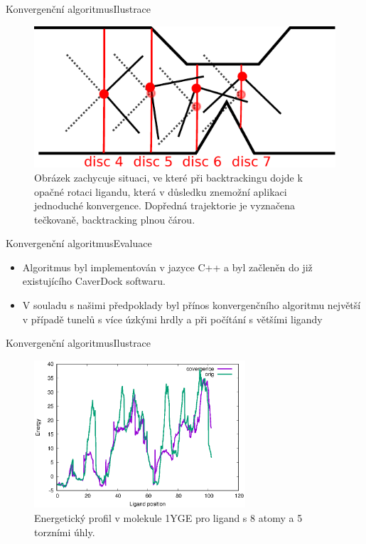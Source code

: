 \documentclass{beamer}
\begin{document}
\begin{frame}{Konvergenční algoritmus}{Ilustrace}
    \begin{figure}
        \includegraphics[width=\textwidth]{img/backtracking_bad_rotation.pdf}
        \caption{Obrázek zachycuje situaci, ve které při backtrackingu dojde k opačné
rotaci ligandu, která v důsledku znemožní aplikaci jednoduché konvergence.
Dopředná trajektorie je vyznačena tečkovaně, backtracking plnou čárou.
}
    \end{figure}
\end{frame}

\begin{frame}{Konvergenční algoritmus}{Evaluace}
    \begin{itemize}
	\item Algoritmus byl implementován v jazyce C++ a byl začleněn do již existujícího CaverDock softwaru.
	\item V souladu s našimi předpoklady byl přínos konvergenčního algoritmu největší v případě
tunelů s více úzkými hrdly a při počítání s většími ligandy
	\end{itemize}
\end{frame}

\begin{frame}{Konvergenční algoritmus}{Ilustrace}
    \begin{figure}
        \includegraphics[width=0.7\textwidth]{img/1YGE_energy_m007.eps}
        \caption{Energetický profil v molekule 1YGE pro ligand s 8 atomy a 5 torzními úhly.}
    \end{figure}
\end{frame}
\end{document}
